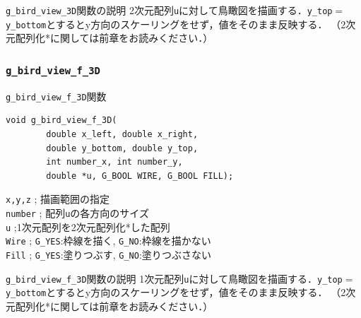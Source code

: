 \documentclass[platex,a4paper,12pt]{jsarticle}%
\begin{document}
\begin{itembox}[l]{\texttt{g\_bird\_view\_3D}関数の説明}
2次元配列\verb|u|に対して鳥瞰図を描画する．\verb|y_top|$=$\verb|y_bottom|とするとy方向のスケーリングをせず，値をそのまま反映する．
（2次元配列化*に関しては前章をお読みください．）
\end{itembox}





\clearpage
\subsubsection{\texttt{g\_bird\_view\_f\_3D}}

\begin{itembox}[l]{\texttt{g\_bird\_view\_f\_3D}関数}
\begin{verbatim}
void g_bird_view_f_3D(
        double x_left, double x_right, 
        double y_bottom, double y_top,
        int number_x, int number_y,
        double *u, G_BOOL WIRE, G_BOOL FILL);
\end{verbatim}
\verb|x,y,z| ; 描画範囲の指定\\
\verb|number| ; 配列\verb|u|の各方向のサイズ\\
\verb|u| ;1次元配列を2次元配列化*した配列\\
\verb|Wire| ; \verb|G_YES|:枠線を描く, \verb|G_NO|:枠線を描かない \\
\verb|Fill| ; \verb|G_YES|:塗りつぶす, \verb|G_NO|:塗りつぶさない 
\end{itembox}

\begin{itembox}[l]{\texttt{g\_bird\_view\_f\_3D}関数の説明}
1次元配列\verb|u|に対して鳥瞰図を描画する．\verb|y_top|$=$\verb|y_bottom|とするとy方向のスケーリングをせず，値をそのまま反映する．
（2次元配列化*に関しては前章をお読みください．）
\end{itembox}
\end{document}
